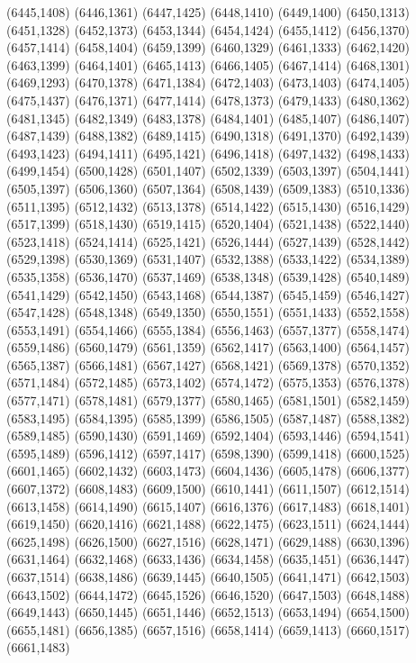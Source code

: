 (6445,1408)
(6446,1361)
(6447,1425)
(6448,1410)
(6449,1400)
(6450,1313)
(6451,1328)
(6452,1373)
(6453,1344)
(6454,1424)
(6455,1412)
(6456,1370)
(6457,1414)
(6458,1404)
(6459,1399)
(6460,1329)
(6461,1333)
(6462,1420)
(6463,1399)
(6464,1401)
(6465,1413)
(6466,1405)
(6467,1414)
(6468,1301)
(6469,1293)
(6470,1378)
(6471,1384)
(6472,1403)
(6473,1403)
(6474,1405)
(6475,1437)
(6476,1371)
(6477,1414)
(6478,1373)
(6479,1433)
(6480,1362)
(6481,1345)
(6482,1349)
(6483,1378)
(6484,1401)
(6485,1407)
(6486,1407)
(6487,1439)
(6488,1382)
(6489,1415)
(6490,1318)
(6491,1370)
(6492,1439)
(6493,1423)
(6494,1411)
(6495,1421)
(6496,1418)
(6497,1432)
(6498,1433)
(6499,1454)
(6500,1428)
(6501,1407)
(6502,1339)
(6503,1397)
(6504,1441)
(6505,1397)
(6506,1360)
(6507,1364)
(6508,1439)
(6509,1383)
(6510,1336)
(6511,1395)
(6512,1432)
(6513,1378)
(6514,1422)
(6515,1430)
(6516,1429)
(6517,1399)
(6518,1430)
(6519,1415)
(6520,1404)
(6521,1438)
(6522,1440)
(6523,1418)
(6524,1414)
(6525,1421)
(6526,1444)
(6527,1439)
(6528,1442)
(6529,1398)
(6530,1369)
(6531,1407)
(6532,1388)
(6533,1422)
(6534,1389)
(6535,1358)
(6536,1470)
(6537,1469)
(6538,1348)
(6539,1428)
(6540,1489)
(6541,1429)
(6542,1450)
(6543,1468)
(6544,1387)
(6545,1459)
(6546,1427)
(6547,1428)
(6548,1348)
(6549,1350)
(6550,1551)
(6551,1433)
(6552,1558)
(6553,1491)
(6554,1466)
(6555,1384)
(6556,1463)
(6557,1377)
(6558,1474)
(6559,1486)
(6560,1479)
(6561,1359)
(6562,1417)
(6563,1400)
(6564,1457)
(6565,1387)
(6566,1481)
(6567,1427)
(6568,1421)
(6569,1378)
(6570,1352)
(6571,1484)
(6572,1485)
(6573,1402)
(6574,1472)
(6575,1353)
(6576,1378)
(6577,1471)
(6578,1481)
(6579,1377)
(6580,1465)
(6581,1501)
(6582,1459)
(6583,1495)
(6584,1395)
(6585,1399)
(6586,1505)
(6587,1487)
(6588,1382)
(6589,1485)
(6590,1430)
(6591,1469)
(6592,1404)
(6593,1446)
(6594,1541)
(6595,1489)
(6596,1412)
(6597,1417)
(6598,1390)
(6599,1418)
(6600,1525)
(6601,1465)
(6602,1432)
(6603,1473)
(6604,1436)
(6605,1478)
(6606,1377)
(6607,1372)
(6608,1483)
(6609,1500)
(6610,1441)
(6611,1507)
(6612,1514)
(6613,1458)
(6614,1490)
(6615,1407)
(6616,1376)
(6617,1483)
(6618,1401)
(6619,1450)
(6620,1416)
(6621,1488)
(6622,1475)
(6623,1511)
(6624,1444)
(6625,1498)
(6626,1500)
(6627,1516)
(6628,1471)
(6629,1488)
(6630,1396)
(6631,1464)
(6632,1468)
(6633,1436)
(6634,1458)
(6635,1451)
(6636,1447)
(6637,1514)
(6638,1486)
(6639,1445)
(6640,1505)
(6641,1471)
(6642,1503)
(6643,1502)
(6644,1472)
(6645,1526)
(6646,1520)
(6647,1503)
(6648,1488)
(6649,1443)
(6650,1445)
(6651,1446)
(6652,1513)
(6653,1494)
(6654,1500)
(6655,1481)
(6656,1385)
(6657,1516)
(6658,1414)
(6659,1413)
(6660,1517)
(6661,1483)
